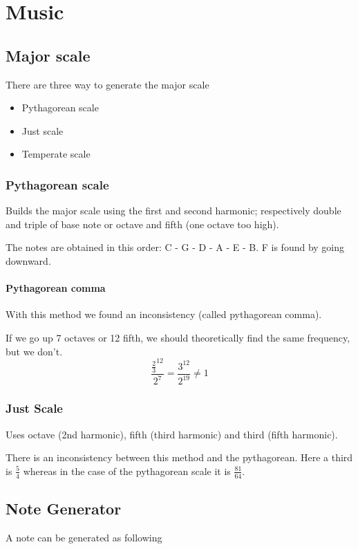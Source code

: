 \chapter{Music}
\section{Major scale}
There are three way to generate the major scale
\begin{itemize}
	\item Pythagorean scale
	\item Just scale
	\item Temperate scale
\end{itemize}

\subsection{Pythagorean scale}
Builds the major scale using the first and second harmonic; respectively double and triple of base note or octave and fifth (one octave too high).

The notes are obtained in this order: C - G - D - A - E - B. F is found by going downward. 

\subsubsection{Pythagorean comma}
With this method we found an inconsistency (called pythagorean comma).

If we go up 7 octaves or 12 fifth, we should theoretically find the same frequency, but we don't. 
\begin{equation}
	\frac{\frac{2}{3}^{12}}{2^7}=\frac{3^{12}}{2^{19}}\neq 1
\end{equation}

\subsection{Just Scale}
Uses octave (2nd harmonic), fifth (third harmonic) and third (fifth harmonic).

There is an inconsistency between this method and the pythagorean. Here a third is $\frac{5}{4}$ whereas in the case of the pythagorean scale it is $\frac{81}{64}$.




\section{Note Generator}
A note can be generated as following

